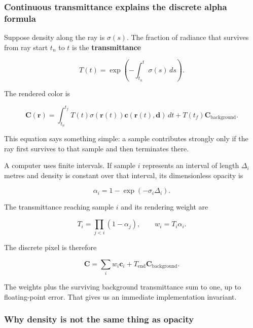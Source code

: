 \subsubsection{Continuous transmittance explains the discrete alpha formula}\label{04-visual-computing-ii-ch035-continuous-transmittance-explains-the-discrete-alpha-formula}

\hypertarget{04-visual-computing-ii-ch035-continuous-transmittance-explains-the-discrete-alpha-formula}{}

Suppose density along the ray is \(\sigma(s)\). The fraction of radiance that survives from ray start \(t_n\) to \(t\) is the \textbf{transmittance}

\[T(t)=\exp\left(-\int_{t_n}^{t}\sigma(s)\,ds\right).\]

The rendered color is

\[\mathbf C(\mathbf r)=\int_{t_n}^{t_f}T(t)\sigma(\mathbf r(t))\mathbf c(\mathbf r(t),\mathbf d)\,dt+T(t_f)\mathbf C_{\mathrm{background}}.\]

This equation says something simple: a sample contributes strongly only if the ray first survives to that sample and then terminates there.

A computer uses finite intervals. If sample \(i\) represents an interval of length \(\Delta_i\) metres and density is constant over that interval, its dimensionless opacity is

\[\alpha_i=1-\exp(-\sigma_i\Delta_i).\]

The transmittance reaching sample \(i\) and its rendering weight are

\[T_i=\prod_{j<i}(1-\alpha_j),\qquad w_i=T_i\alpha_i.\]

The discrete pixel is therefore

\[\mathbf C=\sum_iw_i\mathbf c_i+T_{\mathrm{end}}\mathbf C_{\mathrm{background}}.\]

The weights plus the surviving background transmittance sum to one, up to floating-point error. That gives us an immediate implementation invariant.

\subsubsection{Why density is not the same thing as opacity}\label{04-visual-computing-ii-ch035-why-density-is-not-the-same-thing-as-opacity}

\hypertarget{04-visual-computing-ii-ch035-why-density-is-not-the-same-thing-as-opacity}{}

